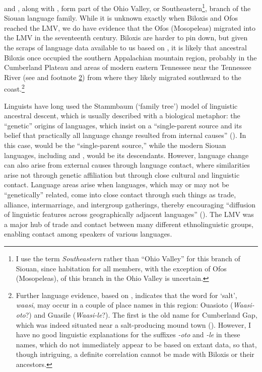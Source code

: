 \documentclass[output=paper]{LSP/langsci}
\begin{document}
 and , along with , form part of the Ohio Valley, or Southeastern\footnote{I use the term \emph{Southeastern} rather than “Ohio Valley” for this branch of Siouan, since habitation for all members, with the exception of Ofos (Mosopeleas), of this branch in the Ohio Valley is uncertain.}, branch of the Siouan language family. While it is unknown exactly when Biloxis and Ofos reached the LMV, we do have evidence that the Ofos (Mosopeleas) migrated into the LMV in the seventeenth century. Biloxis are harder to pin down, but given the scraps of language data available to us based on , it is likely that ancestral Biloxis once occupied the southern Appalachian mountain region, probably in the Cumberland Plateau and areas of modern eastern Tennessee near the Tennessee River (see \citealt{Rankin2011} and footnote \ref{waasi}) from where they likely migrated southward to the  coast.\footnote{\label{waasi}Further language evidence, based on , indicates that the  word for `salt', \emph{waasi}, may occur in a couple of place names in this region: Ouasioto (\emph{Waasi-oto}?) and Guasile (\emph{Waasi-le}?). The first is the old name for Cumberland Gap, which was indeed situated near a salt-producing mound town (\citealt{Meyer1925}). However, I have no good linguistic explanations for the suffixes \emph{-oto} and \emph{-le} in these names, which do not immediately appear to be  based on extant data, so that, though intriguing, a definite correlation cannot be made with Biloxis or their ancestors.}

Linguists have long used the Stammbaum (`family tree') model of linguistic ancestral descent, which is usually described with a biological metaphor: the “genetic” origins of languages, which insist on a “single-parent source and its belief that practically all language change resulted from internal causes” (\citealt[7]{Winford2003}). In this case,  would be the “single-parent source,” while the modern Siouan languages, including  and , would be its descendants. However, language change can also arise from external causes through language contact, where similarities arise not through genetic affiliation but through close cultural and linguistic contact. Language areas arise when languages, which may or may not be “genetically” related, come into close contact through such things as trade, alliance, intermarriage, and intergroup gatherings, thereby encouraging “diffusion of linguistic features across geographically adjacent languages” (\citealt[7]{Winford2003}). The LMV was a major hub of trade and contact between many different ethnolinguistic groups, enabling contact among speakers of various languages. 
\end{document}
